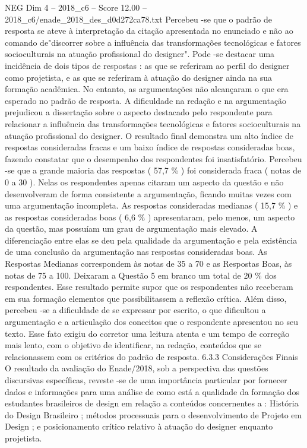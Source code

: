 \begin{textsample}{NEG Dim 4 – 2018\_c6 – Score 12.00 – 2018\_c6/enade\_2018\_des\_d0d272ca78.txt}
Percebeu -se que o padrão de resposta se ateve à interpretação da citação apresentada no enunciado e não ao comando de"discorrer sobre a influência das transformações tecnológicas e fatores socioculturais na atuação profissional do designer".
Pode -se destacar uma incidência de dois tipos de respostas : as que se referiram ao perfil do designer como projetista, e as que se referiram à atuação do designer ainda na sua formação acadêmica.
No entanto, as argumentações não alcançaram o que era esperado no padrão de resposta.
A dificuldade na redação e na argumentação prejudicou a dissertação sobre o aspecto destacado pelo respondente para relacionar a influência das transformações tecnológicas e fatores socioculturais na atuação profissional do designer.
O resultado final demonstra um alto índice de respostas consideradas fracas e um baixo índice de respostas consideradas boas, fazendo constatar que o desempenho dos respondentes foi insatisfatório.
Percebeu -se que a grande maioria das respostas ( 57,7 \% ) foi considerada fraca ( notas de 0 a 30 ).
Nelas os respondentes apenas citaram um aspecto da questão e não desenvolveram de forma consistente a argumentação, ficando muitas vezes com uma argumentação incompleta.
As respostas consideradas medianas ( 15,7 \% ) e as respostas consideradas boas ( 6,6 \% ) apresentaram, pelo menos, um aspecto da questão, mas possuíam um grau de argumentação mais elevado.
A diferenciação entre elas se deu pela qualidade da argumentação e pela existência de uma conclusão da argumentação nas respostas consideradas boas.
As Respostas Medianas correspondem às notas de 35 a 70 e as Respostas Boas, às notas de 75 a 100.
Deixaram a Questão 5 em branco um total de 20 \% dos respondentes.
Esse resultado permite supor que os respondentes não receberam em sua formação elementos que possibilitassem a reflexão crítica.
Além disso, percebeu -se a dificuldade de se expressar por escrito, o que dificultou a argumentação e a articulação dos conceitos que o respondente apresentou no seu texto.
Esse fato exigiu do corretor uma leitura atenta e um tempo de correção mais lento, com o objetivo de identificar, na redação, conteúdos que se relacionassem com os critérios do padrão de resposta. 6.3.3 Considerações Finais O resultado da avaliação do Enade/2018, sob a perspectiva das questões discursivas específicas, reveste -se de uma importância particular por fornecer dados e informações para uma análise de como está a qualidade da formação dos estudantes brasileiros de design em relação a conteúdos concernentes a : História do Design Brasileiro ; métodos processuais para o desenvolvimento de Projeto em Design ; e posicionamento crítico relativo à atuação do designer enquanto projetista.

\end{textsample}
